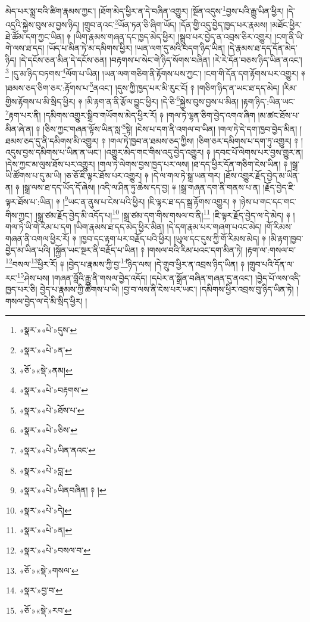 མེད་པར་སྨྲ་བའི་ཚིག་རྣམས་ཀྱང་། །ཐོག་མེད་ཕྱིར་ན་དེ་བཞིན་འགྱུར། །སྔོན་འདུས་\footnote{«སྣར་»«པེ་»དུས་}བྱས་པའི་རྒྱུ་ཡིན་ཕྱིར། །དེ་འདྲའི་སྐྱེས་བུས་མ་བྱས་ཉིད། །གྲུབ་ནའང་\footnote{«སྣར་»«པེ་»ན་}ཡོན་ཏན་ཅི་ཞིག་ཡོད། །དོན་གྱི་འདུ་བྱེད་ཁྱད་པར་རྣམས། །མཐོང་ཕྱིར་ཐེ་ཚོམ་དག་ཀྱང་ཡིན། ༈ །ཡིག་རྣམས་གཞན་དང་ཁྱད་མེད་ཕྱིར། །སྒྲུབ་པར་བྱེད་ན་འབྲས་ཅིར་འགྱུར། །ངག་ནི་ཡི་གེ་ལས་ཐ་དད། །ཡོད་པ་མིན་ཏེ་མ་དམིགས་ཕྱིར། །ཡན་ལག་དུ་མའི་བདག་ཉིད་ཡིན། །དེ་རྣམས་ཐ་དད་དོན་མེད་ཉིད། །དེ་དངོས་ཅན་མིན་དེ་དངོས་ཅན། །བརྟགས་པ་སེང་གེ་ཉིད་སོགས་བཞིན། །རེ་རེ་དོན་བཅས་ཉིད་ཡིན་ནའང་།\footnote{«ཅོ་»«སྡེ་»ནམ།} །དུ་མ་ཉིད་བཏགས་\footnote{«སྣར་»«པེ་»བརྟགས་}ལོག་པ་ཡིན། །ཡན་ལག་གཅིག་ནི་རྟོགས་པས་ཀྱང་། །ངག་གི་དོན་དག་རྟོགས་པར་འགྱུར། ༈ །ཐམས་ཅད་ཅིག་ཅར་:རྟོགས་པ་\footnote{«སྣར་»«པེ་»ཐོས་པ་}ནའང་། །དུས་ཀྱི་ཁྱད་པར་མི་རུང་ངོ། ༈ །གཅིག་ཉིད་ན་ཡང་ཐ་དད་མེད། །རིམ་གྱིས་རྟོགས་པ་མི་སྲིད་ཕྱིར། ༈ །མི་རྟག་ན་ནི་རྩོལ་བྱུང་ཕྱིར། །དེ་ཅི་\footnote{«སྣར་»«པེ་»ཅིས་}སྐྱེས་བུས་བྱས་པ་མིན། །རྟག་ཉིད་:ཡིན་ཡང་\footnote{«སྣར་»«པེ་»ཡིན་ནའང་}རྟག་པར་ནི། །དམིགས་འགྱུར་སྒྲིབ་གཡོགས་མེད་ཕྱིར་རོ། ༈ །གལ་ཏེ་ལྷན་ཅིག་བྱེད་འགའ་ཞིག །མ་ཚང་ཐོས་པ་མིན་ཞེ་ན། ༈ །ཅིས་ཀྱང་གཞན་ལྟོས་ཡིན་སླ་\footnote{«སྣར་»«པེ་»བླ་}སྟེ། །ངེས་པ་དག་ནི་འགལ་བ་ཡིན། །གལ་ཏེ་དེ་དག་ཁྱབ་བྱེད་མིན། །ཐམས་ཅད་དུ་ནི་དམིགས་མི་འགྱུར། ༈ །གལ་ཏེ་ཁྱབ་ན་ཐམས་ཅད་ཀྱིས། །ཅིག་ཅར་དམིགས་པ་དག་ཏུ་འགྱུར། ༈ །འདུས་བྱས་དམིགས་པ་ཡིན་ན་ཡང་། །འགྱུར་མེད་གང་གིས་འདུ་བྱེད་འགྱུར། ༈ །དབང་པོ་ལེགས་པར་བྱས་གྱུར་ན། །དེས་ཀྱང་མ་ལུས་ཐོས་པར་འགྱུར། །གལ་ཏེ་ལེགས་བྱས་ཁྱད་པར་ལས། །ཐ་དད་ཕྱིར་དོན་གཅིག་ངེས་ཡིན། ༈ །སྒྲ་ཡི་ཚོགས་པ་དུ་མ་ཡི། །ཅ་ཅོ་ཇི་ལྟར་ཐོས་པར་འགྱུར། ༈ །དེ་ལ་གལ་ཏེ་སྒྲ་ཡན་གར། །ཐོས་འགྱུར་རྗོད་བྱེད་མ་ཡིན་ན། ༈ །སྒྲ་ལས་ཐ་དད་ཡོད་དོ་ཞེས། །འདི་ལ་ཤིན་ཏུ་ཆེས་དད་བྱ། ༈ །སྒྲ་གཞན་དག་ནི་གནས་པ་ན། །རྗོད་བྱེད་ཇི་ལྟར་ཐོས་པ་:ཡིན། ༈ །\footnote{«སྣར་»«པེ་»ཡིནབཞིན། ༈ །}ཡང་ན་ནུས་པ་ངེས་པའི་ཕྱིར། །ཇི་ལྟར་ཐ་དད་སྒྲ་རྟོགས་འགྱུར། ༈ །ཉེས་པ་གང་དང་གང་གིས་ཀྱང་། །སྒྲ་ཙམ་རྗོད་བྱེད་མི་འདོད་པ།\footnote{«སྣར་»«པེ་»དེ།} །སྒྲ་ཙམ་དག་གིས་གསལ་བ་ནི།\footnote{«སྣར་»«པེ་»ན།} །ཇི་ལྟར་རྗོད་བྱེད་ལ་དེ་མེད། ༈ །གལ་ཏེ་ཡི་གེ་རིམ་པ་དག །ཡིག་རྣམས་ཐ་དད་མེད་ཕྱིར་མིན། །དེ་དག་རྣམ་པར་གཞག་པའང་མེད། །གོ་རིམས་གཞན་ནི་འགལ་ཕྱིར་རོ། ༈ །ཁྱབ་དང་རྟག་པར་བརྗོད་པའི་ཕྱིར། །ཡུལ་དང་དུས་ཀྱི་གོ་རིམས་མེད། ༈ །མི་རྟག་ཁྱབ་བྱེད་མ་ཡིན་པའི། །སྐྱོན་ཡང་སྔར་ནི་བརྗོད་པ་ཡིན། ༈ །གསལ་བའི་རིམ་པའང་དག་མིན་ཏེ། །རྟག་ལ་:གསལ་བ་\footnote{«སྣར་»«པེ་»བསལ་བ་}བསལ་\footnote{«ཅོ་»«སྡེ་»གསལ་}ཕྱིར་རོ། ༈ །བྱེད་པ་རྣམས་ཀྱི་བྱ་\footnote{«སྣར་»བྱ་བ་}ཉིད་ལས། །དེ་གྲུབ་ཕྱིར་ན་འབྲས་ཉིད་ཡིན། ༈ །གྲུབ་པའི་དོན་ལ་རང་\footnote{«ཅོ་»«སྡེ་»རབ་}ཤེས་པས། །གཞན་བློའི་རྒྱུ་ནི་གསལ་བྱེད་འདོད། །དཔེར་ན་སྒྲོན་བཞིན་གཞན་དུ་ནའང་། །བྱེད་པོ་ལས་འདི་ཁྱད་པར་ཅི། བྱེད་པ་རྣམས་ཀྱི་ཚོགས་པ་ཡི། །བྱ་བ་ལས་ནི་ངེས་པར་ཡང་། །དམིགས་ཕྱིར་འབྲས་བུ་ཉིད་ཡིན་ཏེ། །གསལ་བྱེད་ལ་དེ་མི་སྲིད་ཕྱིར། །
